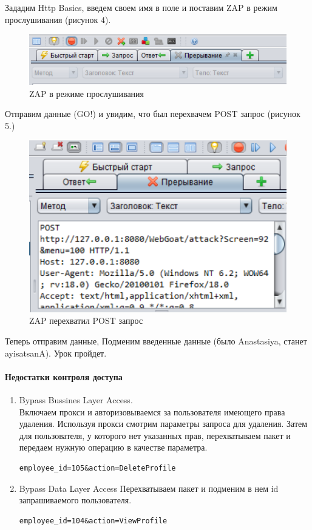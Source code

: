 \documentclass[10pt,a4paper]{article}
\begin{document}
\FloatBarrier
Зададим Http Basics, введем своем имя в поле и поставим ZAP в режим прослушивания (рисунок 4).
\FloatBarrier
\begin{figure}[h!]
\centering
\includegraphics[scale=0.4]{4}
\caption{ZAP в режиме прослушивания}
\end{figure}
\FloatBarrier
Отправим данные (GO!) и увидим, что был перехвачем POST запрос (рисунок 5.)
\FloatBarrier
\begin{figure}[h!]
\centering
\includegraphics[scale=0.4]{5}
\caption{ZAP перехватил POST запрос}
\end{figure}
\FloatBarrier
Теперь отправим данные, Подменим введенные данные (было Anastasiya, станет ayisatsanA). Урок пройдет.
\paragraph{Недостатки контроля доступа}
\begin{enumerate}
\item Bypass Bussines Layer Access.\\
Включаем прокси и авторизовываемся за пользователя имеющего права удаления. Используя прокси смотрим параметры запроса для удаления.
Затем для пользователя, у которого нет указанных прав, перехватываем пакет и передаем нужную операцию в качестве параметра.
\begin{verbatim}
employee_id=105&action=DeleteProfile
\end{verbatim}
\item Bypass Data Layer Access
Перехватываем пакет и подменим в нем id запрашиваемого пользователя.
\begin{verbatim}
employee_id=104&action=ViewProfile
\end{verbatim}
\end{enumerate}
\end{document}
